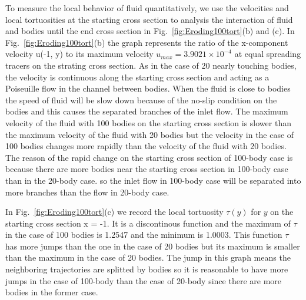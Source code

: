 \documentclass[preprint, 10pt]{elsarticle}
\begin{document}
{To measure the local behavior of fluid quantitatively, 
we use the velocities and local tortuosities at the starting cross section 
to analysis the interaction of fluid and bodies until the end cross section 
in Fig.~\ref{fig:Eroding100tort}(b) and (c).
In Fig.~\ref{fig:Eroding100tort}(b) the graph represents the ratio of the
x-component velocity u(-1, y) to its maximum velocity $u_{max}=3.9021
\times 10^{-4}$ at equal spreading tracers on the strating cross section.
As in the case of 20 nearly touching bodies, the velocity is continuous along
the starting cross section and acting as a Poiseuille flow in the channel between
bodies. When the fluid is close to bodies
the speed of fluid will be slow down because of the no-slip condition on the bodies
and this causes the separated branches of the inlet flow.
The maximum velocity of the fluid with 100 bodies on the starting cross 
section is slower than the maximum velocity of the fluid with 20 bodies
but the velocity in the case of 100 bodies 
changes more rapidly than the velocity of the fluid with 20 bodies.
The reason of the rapid change on the starting cross section of 
100-body case is because there are 
more bodies near the starting cross section in
100-body case than in the 20-body case. 
so the inlet flow in 100-body case
will be separated into more branches than the flow in 20-body case. 

In Fig.~\ref{fig:Eroding100tort}(c) we record the 
local tortuosity $\tau(y)$ for $y$ on the starting cross section x = -1.
It is a discontinous function and the maximum of $\tau$ in the case of 100 bodies
is 1.2547 and the minimum is 1.0003. This function $\tau$
has more jumps than the one in the case of 20 bodies but its maximum 
is smaller than the maximum in the case of 20 bodies. 
The jump in this graph means the neighboring trajectories are splitted by bodies
so it is reasonable to have more jumps in the case of 100-body than the case of 20-body
since there are more bodies in the former case. 

}
\end{document}
